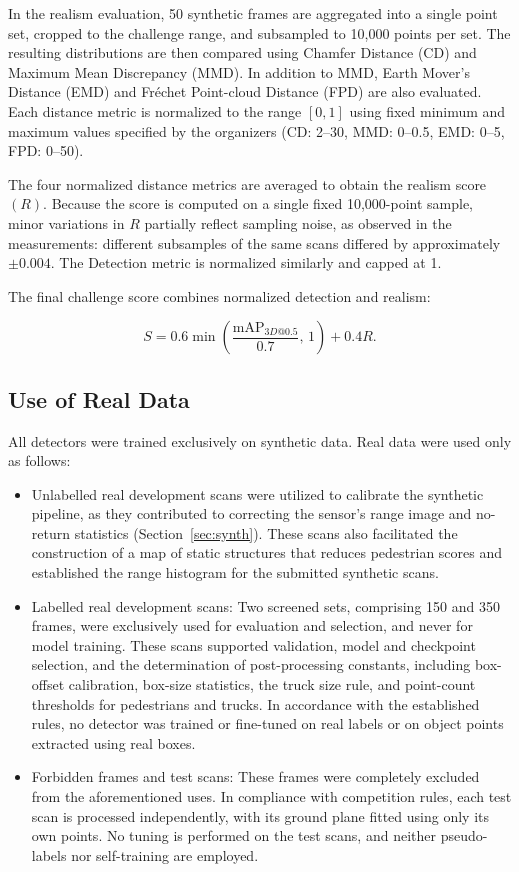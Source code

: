 \documentclass[conference]{IEEEtran}
\begin{document}
In the realism evaluation, 50 synthetic frames are aggregated into a single point set, cropped to the challenge range, and subsampled to 10,000 points per set. The resulting distributions are then compared using Chamfer Distance (CD) and Maximum Mean Discrepancy (MMD).
In addition to MMD, Earth Mover's Distance (EMD) and Fr\'echet Point-cloud Distance (FPD) are also evaluated.
Each distance metric is normalized to the range $[0,1]$ using fixed minimum and maximum values specified by the organizers (CD: 2–30, MMD: 0–0.5, EMD: 0–5, FPD: 0–50).

The four normalized distance metrics are averaged to obtain the
realism score $(R)$. Because the score is computed on a single fixed 10,000-point sample, minor variations in $R$ partially reflect sampling noise, as observed in the measurements: different subsamples of the same scans differed by approximately $\pm 0.004$. The Detection metric is normalized similarly and capped at 1.

The final challenge score combines normalized detection and realism:

\begin{equation}
S = 0.6 \min\left(\frac{\mathrm{mAP}_{3D@0.5}}{0.7},\,1\right)
    + 0.4R. \label{eq:combined_score}
\end{equation}

\subsection{Use of Real Data}

All detectors were trained exclusively on synthetic data. Real data were used only as follows:
\begin{itemize}
    \item Unlabelled real development scans were utilized to calibrate the synthetic pipeline, as they contributed to correcting the sensor's range image and no-return statistics (Section~\ref{sec:synth}). These scans also facilitated the construction of a map of static structures that reduces pedestrian scores and established the range histogram for the submitted synthetic scans.
    \item Labelled real development scans: Two screened sets, comprising 150 and 350 frames, were exclusively used for evaluation and selection, and never for model training. These scans supported validation, model and checkpoint selection, and the determination of post-processing constants, including box-offset calibration, box-size statistics, the truck size rule, and point-count thresholds for pedestrians and trucks. In accordance with the established rules, no detector was trained or fine-tuned on real labels or on object points extracted using real boxes.
    \item Forbidden frames and test scans: These frames were completely excluded from the aforementioned uses. In compliance with competition rules, each test scan is processed independently, with its ground plane fitted using only its own points. No tuning is performed on the test scans, and neither pseudo-labels nor self-training are employed.
\end{itemize}
\end{document}
